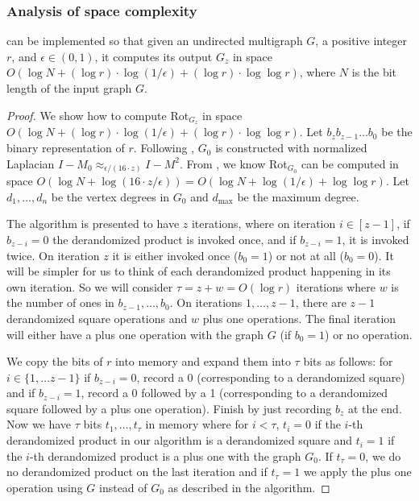 \documentclass{toc}
\newcommand{\SC}{O(\log N + (\log r)\cdot\log(1/\epsilon)+(\log r)\cdot \log\log r)}
\newcommand{\dmax}{d_{\mathrm{max}}}
\numberwithin{myalgctr}{section}
\theoremstyle{named}
\begin{document}
\subsubsection{Analysis of space complexity}
\begin{lemma}
\label{lem:pf_of_space}
 can be implemented so that given an undirected multigraph $G$, a positive integer $r$, and $\epsilon\in(0,1)$, it computes its output $G_z$ in space $\SC$, where $N$ is the bit length of the input graph $G$. 
\end{lemma}
\begin{proof}
We show how to compute Rot$_{G_z}$ in space $\SC$. Let $b_zb_{z-1}\ldots b_0$ be the binary representation of $r$. Following , $G_0$ is constructed with normalized Laplacian $I-M_0\approx_{\epsilon/(16\cdot z)}I-M^2$. {}From , we know Rot$_{G_0}$ can be computed in space $O(\log N + \log(16\cdot z/\epsilon))=O(\log N+\log(1/\epsilon)+\log\log r)$. Let $d_1,\ldots,d_n$ be the vertex degrees in $G_0$ and $\dmax$ be the maximum degree. 

The algorithm is presented to have $z$ iterations, where on iteration $i\in[z-1]$, if $b_{z-i}=0$ the derandomized product is invoked once, and if $b_{z-i}=1$, it is invoked twice. On iteration $z$ it is either invoked once ($b_0=1$)  or not at all ($b_0=0$). It will be simpler for us to think of each derandomized product happening in its own iteration. So we will consider $\tau=z+w=O(\log r)$ iterations where $w$ is the number of ones in $b_{z-1},\ldots,b_{0}$. On iterations $1,\ldots,z-1$, there are $z-1$ derandomized square operations and $w$ plus one operations. The final iteration will either have a plus one operation with the graph $G$ (if $b_0=1$) or no operation.

We copy the bits of $r$ into memory and expand them into $\tau$ bits as follows: for $i\in\{1,\ldots z-1\}$ if $b_{z-i}=0$, record a 0 (corresponding to a derandomized square) and if $b_{z-i}=1$, record a 0 followed by a 1 (corresponding to a derandomized square followed by a plus one operation). Finish by just recording $b_z$ at the end. Now we have $\tau$ bits $t_1,\ldots, t_\tau$ in memory where for $i<\tau$, $t_i=0$ if the $i$-th derandomized product in our algorithm is a derandomized square and $t_i=1$ if the $i$-th derandomized product is a plus one with the graph $G_0$. If $t_\tau=0$, we do no derandomized product on the last iteration and if $t_\tau=1$ we apply the plus one operation using $G$ instead of $G_0$ as described in the algorithm. 


\end{proof}
\end{document}
